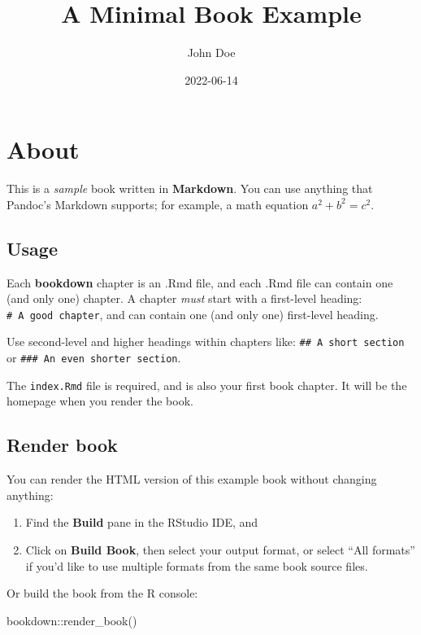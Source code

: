 \documentclass[
]{book}
\title{A Minimal Book Example}
\author{John Doe}
\date{2022-06-14}
\newenvironment{Shaded}{\begin{snugshade}}{\end{snugshade}}
\newcommand{\FunctionTok}[1]{\textcolor[rgb]{0.00,0.00,0.00}{#1}}
\newcommand{\NormalTok}[1]{#1}
\newcommand{\SpecialCharTok}[1]{\textcolor[rgb]{0.00,0.00,0.00}{#1}}
\theoremstyle{definition}
\theoremstyle{definition}
\theoremstyle{definition}
\theoremstyle{definition}
\theoremstyle{remark}
\begin{document}
\maketitle

{
\setcounter{tocdepth}{1}
\tableofcontents
}
\hypertarget{about}{%
\chapter{About}\label{about}}

This is a \emph{sample} book written in \textbf{Markdown}. You can use anything that Pandoc's Markdown supports; for example, a math equation \(a^2 + b^2 = c^2\).

\hypertarget{usage}{%
\section{Usage}\label{usage}}

Each \textbf{bookdown} chapter is an .Rmd file, and each .Rmd file can contain one (and only one) chapter. A chapter \emph{must} start with a first-level heading: \texttt{\#\ A\ good\ chapter}, and can contain one (and only one) first-level heading.

Use second-level and higher headings within chapters like: \texttt{\#\#\ A\ short\ section} or \texttt{\#\#\#\ An\ even\ shorter\ section}.

The \texttt{index.Rmd} file is required, and is also your first book chapter. It will be the homepage when you render the book.

\hypertarget{render-book}{%
\section{Render book}\label{render-book}}

You can render the HTML version of this example book without changing anything:

\begin{enumerate}
\def\labelenumi{\arabic{enumi}.}
\item
  Find the \textbf{Build} pane in the RStudio IDE, and
\item
  Click on \textbf{Build Book}, then select your output format, or select ``All formats'' if you'd like to use multiple formats from the same book source files.
\end{enumerate}

Or build the book from the R console:

\begin{Shaded}
\begin{Highlighting}[]
\NormalTok{bookdown}\SpecialCharTok{::}\FunctionTok{render\_book}\NormalTok{()}
\end{Highlighting}
\end{Shaded}
\end{document}
